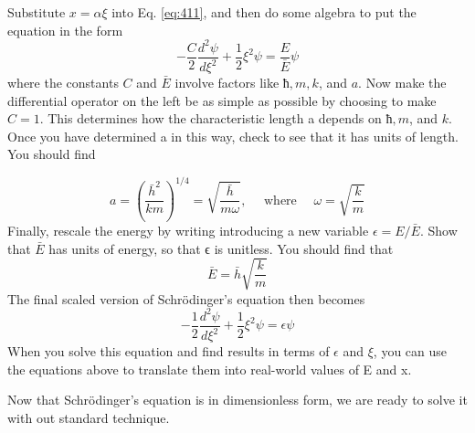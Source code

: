 	\begin{problem} \label{P4.3}  Substitute $x = \alpha \xi$ into Eq. \eqref{eq:411}, and then do some algebra to put the
equation in the form
\begin{equation}\label{eq:412}
-\frac{C}{2} \frac{d^{2} \psi}{d \xi^{2}}+\frac{1}{2} \xi^{2} \psi=\frac{E}{\bar{E}} \psi
\end{equation}
where the constants $C$ and $\bar{E}$ involve factors like $ħ, m, k$, and $a$.
Now make the differential operator on the left be as simple as possible by
choosing to make $C = 1$. This determines how the characteristic length a
depends on $ħ, m$, and $k$. Once you have determined a in this way, check to
see that it has units of length. You should find

\begin{equation}\label{eq:413}
a=\left(\frac{\bar{h}^{2}}{k m}\right)^{1 / 4}=\sqrt{\frac{\bar{h}}{m \omega}}, \quad \text { where } \quad \omega=\sqrt{\frac{k}{m}}
\end{equation}
Finally, rescale the energy by writing introducing a new variable $	\epsilon = E/\bar{E}$.
Show that $\bar{E}$ has units of energy, so that ϵ is unitless. You should find that
 \begin{equation}\label{eq:414}
\bar{E} = \bar{h}\sqrt{\frac{k}{m}}
\end{equation}
The final scaled version of Schrödinger\rq s equation then becomes
\begin{equation}\label{eq:415}
-\frac{1}{2} \frac{d^{2} \psi}{d \xi^{2}}+\frac{1}{2} \xi^{2} \psi=\epsilon \psi
\end{equation}
When you solve this equation and find results in terms of $\epsilon$ and $\xi$, you can
use the equations above to translate them into real-world values of E and x.\\ \end{problem}
Now that Schrödinger\rq s equation is in dimensionless form, we are ready to
solve it with out standard technique.



